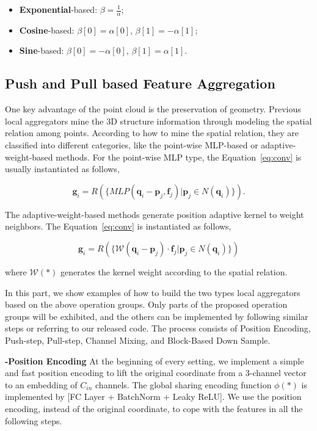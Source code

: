 \documentclass[journal]{IEEEtran}
\begin{document}
\begin{itemize}
\item {\bf Exponential}-based: $\beta=\frac{1}{\alpha}$;
    \item {\bf Cosine}-based: $\beta[0]=\alpha[0]$, $\beta[1]=-\alpha[1]$;
    \item {\bf Sine}-based: $\beta[0]=-\alpha[0]$, $\beta[1]=\alpha[1]$.
\end{itemize}



\subsection{Push and Pull based Feature Aggregation}

One key advantage of the point cloud is the preservation of geometry. Previous local aggregators mine the 3D structure information through modeling the spatial relation among points. According to how to mine the spatial relation, they are classified into different categories, like the point-wise MLP-based or adaptive-weight-based methods. For the point-wise MLP type, the Equation~\ref{eq:conv} is usually instantiated as follows,

\begin{equation}
\label{eq:pointwise}
\mathbf{g}_i = R(\{MLP(\mathbf{q}_{i}-\mathbf{p}_{j}, \mathbf{f}_j)|\mathbf{p}_{j}\in N(\mathbf{q}_i)\}).
\end{equation}

\noindent
The adaptive-weight-based methods generate position adaptive kernel to weight neighbors. The Equation~\ref{eq:conv} is instantiated as follows,

\begin{equation}
\label{eq:adaptive}
\mathbf{g}_i = R(\{\mathcal{W}(\mathbf{q}_{i}-\mathbf{p}_{j})\cdot\mathbf{f}_j|\mathbf{p}_{j}\in N(\mathbf{q}_i)\})
\end{equation}

 \noindent
 where $\mathcal{W}(*)$ generates the kernel weight according to the spatial relation.
 
In this part, we show examples of how to build the two types local aggregators based on the above operation groups. Only parts of the proposed operation groups will be exhibited, and the others can be implemented by following similar steps or referring to our released code. The process consists of Position Encoding, Push-step, Pull-step, Channel Mixing, and Block-Based Down Sample.


\noindent
{\bf -Position Encoding} At the beginning of every setting, we implement a simple and fast position encoding to lift the original coordinate from a 3-channel vector to an embedding of $C_{in}$ channels. The global sharing encoding function $\phi(*)$ is implemented by [FC Layer + BatchNorm + Leaky ReLU]. We use the position encoding, instead of the original coordinate, to cope with the features in all the following steps.
\end{document}
